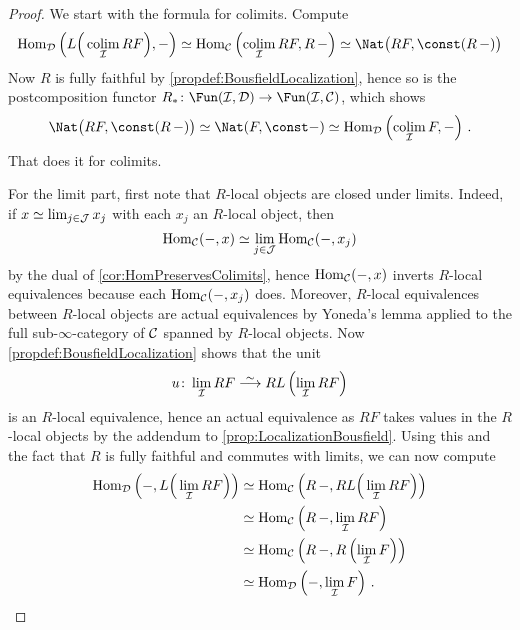 \begin{proof}
	We start with the formula for colimits. Compute
	\begin{equation*}
		\Hom_\Dd\left(L\Big(\colimit_\Ii RF\Big),-\right)\simeq \Hom_\Cc\left(\colimit_\Ii RF,R\,-\right)\simeq \Nat\big(RF,\const (R\,-)\big)
	\end{equation*}
	Now $R$ is fully faithful by \cref{propdef:BousfieldLocalization}, hence so is the postcomposition functor $R_*\colon \Fun(\Ii,\Dd)\morphism\Fun(\Ii,\Cc)$, which shows
	\begin{equation*}
		\Nat\big(RF,\const (R\,-)\big)\simeq \Nat(F,\const-)\simeq \Hom_\Dd\left(\colimit_\Ii F,-\right)\,.\nopagebreak
	\end{equation*}
	That does it for colimits.
	
	For the limit part, first note that $R$-local objects are closed under limits. Indeed, if $x\simeq\operatorname*{lim}_{j\in \mathcal{J}}x_j$ with each $x_j$ an $R$-local object, then
	\begin{equation*}
		\operatorname{Hom}_{\mathcal{C}}(-,x)\simeq \operatorname*{lim}_{j\in \mathcal{J}}\operatorname{Hom}_{\mathcal{C}}(-,x_j)
	\end{equation*}
	by the dual of \cref{cor:HomPreservesColimits}, hence $\operatorname{Hom}_{\mathcal{C}}(-,x)$ inverts $R$-local equivalences because each $\operatorname{Hom}_{\mathcal{C}}(-,x_j)$ does. Moreover, $R$-local equivalences between $R$-local objects are actual equivalences by Yoneda's lemma applied to the full sub-$\infty$-category of $\mathcal{C}$ spanned by $R$-local objects. Now \cref{propdef:BousfieldLocalization} shows that the unit
	\begin{equation*}
		u\colon \limit_\Ii RF\isomorphism RL\left(\limit_\Ii RF\right)
	\end{equation*}
	is an $R$-local equivalence, hence an actual equivalence as $RF$ takes values in the $R$-local objects by the addendum to \cref{prop:LocalizationBousfield}. Using this and the fact that $R$ is fully faithful and commutes with limits, we can now compute
	\begin{align*}
		\operatorname{Hom}_{\mathcal{D}}\left(-,L\Big(\operatorname*{lim}_{\mathcal{I}} RF\Big)\right)&\simeq \operatorname{Hom}_{\mathcal{C}}\left(R\,-,RL\Big(\operatorname*{lim}_{\mathcal{I}} RF\Big)\right)\\
		&\simeq \operatorname{Hom}_{\mathcal{C}}\left(R\,-,\operatorname*{lim}_{\mathcal{I}} RF\right)\\
		&\simeq \operatorname{Hom}_{\mathcal{C}}\left(R\,-,R\left(\operatorname*{lim}_{\mathcal{I}} F\right)\right)\\
		&\simeq \operatorname{Hom}_{\mathcal{D}}\left(-,\operatorname*{lim}_{\mathcal{I}} F\right)\,.\tag*{\qedhere}
	\end{align*}
\end{proof}
